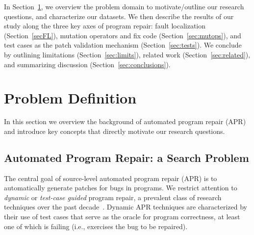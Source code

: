 \documentclass[10pt, conference]{IEEEtran}
\begin{document}
In Section~\ref{sec:background}, we overview the problem domain to
motivate/outline our research questions, and characterize our datasets.
We then describe the results of our study along the
three key axes of program repair: fault localization (Section~\ref{secFL}),
mutation operators and fix code (Section~\ref{sec:mutops}), and test cases as
the patch validation mechanism (Section~\ref{sec:tests}).  We conclude by
outlining limitations (Section~\ref{sec:limits}), related work
(Section~\ref{sec:related}), and summarizing discussion  (Section~\ref{sec:conclusions}).

\section{Problem Definition}
\label{sec:background}

In this section we overview the background of automated program repair (APR) and
introduce key concepts that directly motivate our research questions.

\subsection{Automated Program Repair: a Search Problem}

The central goal of source-level automated program repair (APR) is to
automatically generate patches for bugs in programs. We restrict attention to
\emph{dynamic} or \emph{test-case guided} program repair, a prevalent class of
research techniques over the past decade~\cite{cacm19}.  Dynamic APR techniques
are characterized by their use of test cases that serve as the oracle for
program correctness, at least one of which is failing (i.e., exercises the bug
to be repaired).
\end{document}
